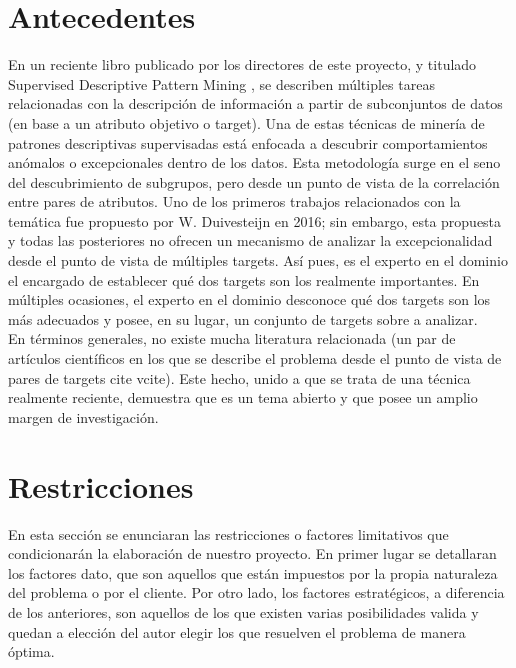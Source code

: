 \documentclass[a4paper, 12pt]{book}
\begin{document}
\section{Antecedentes}
En un reciente libro publicado por los directores de este proyecto, y titulado Supervised Descriptive Pattern Mining \cite{}, se describen múltiples tareas relacionadas con la descripción de información a partir de subconjuntos de datos (en base a un atributo objetivo o target). Una de estas técnicas de minería de patrones descriptivas supervisadas está enfocada a descubrir comportamientos anómalos o excepcionales dentro de los datos. Esta metodología surge en el seno del descubrimiento de subgrupos, pero desde un punto de vista de la correlación entre pares de atributos. Uno de los primeros trabajos relacionados con la temática fue propuesto por W. Duivesteijn \cite{} en 2016; sin embargo, esta propuesta y todas las posteriores no ofrecen un mecanismo de analizar la excepcionalidad desde el punto de vista de múltiples targets. Así pues, es el experto en el dominio el encargado de establecer qué dos targets son los realmente importantes. En múltiples ocasiones, el experto en el dominio desconoce qué dos targets son los más adecuados y posee, en su lugar, un conjunto de targets sobre a analizar.\\

En términos generales, no existe mucha literatura relacionada (un par de artículos científicos en los que se describe el problema desde el punto de vista de pares de targets cite{} vcite{}). Este hecho, unido a que se trata de una técnica realmente reciente, demuestra que es un tema abierto y que posee un amplio margen de investigación.

\newpage
\section{Restricciones}
En esta sección se enunciaran las restricciones o factores limitativos que condicionarán la elaboración de nuestro proyecto. En primer lugar se detallaran los factores dato, que son aquellos que están impuestos por la propia naturaleza del problema o por el cliente. Por otro lado, los factores estratégicos, a diferencia de los anteriores, son aquellos de los que existen varias posibilidades valida y quedan a elección del autor elegir los que resuelven el problema de manera óptima.\\
\end{document}

